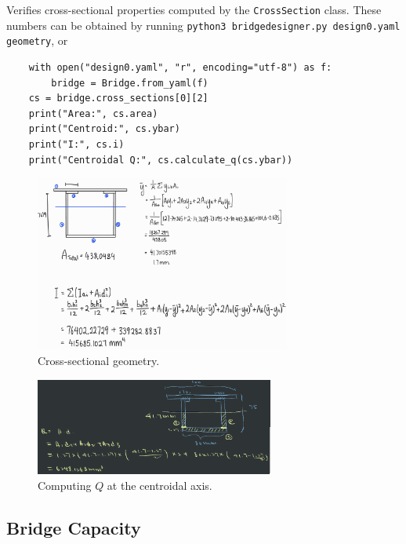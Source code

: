 \documentclass{article}
\begin{document}
Verifies cross-sectional properties computed by the \texttt{CrossSection} class.
These numbers can be obtained by running \texttt{python3 bridgedesigner.py design0.yaml geometry}, or
\begin{verbatim}
    with open("design0.yaml", "r", encoding="utf-8") as f:
        bridge = Bridge.from_yaml(f)
    cs = bridge.cross_sections[0][2]
    print("Area:", cs.area)
    print("Centroid:", cs.ybar)
    print("I:", cs.i)
    print("Centroidal Q:", cs.calculate_q(cs.ybar))
\end{verbatim}

\begin{figure}[H]
    \centering
    \includegraphics[width=0.75\textwidth]{crosssection.png}
    \caption{Cross-sectional geometry.}
\end{figure}

\begin{figure}[H]
    \centering
    \includegraphics[width=0.7\textwidth]{qcent.png}
    \caption{Computing \(Q\) at the centroidal axis.}
\end{figure}

\subsection{Bridge Capacity}
\end{document}
